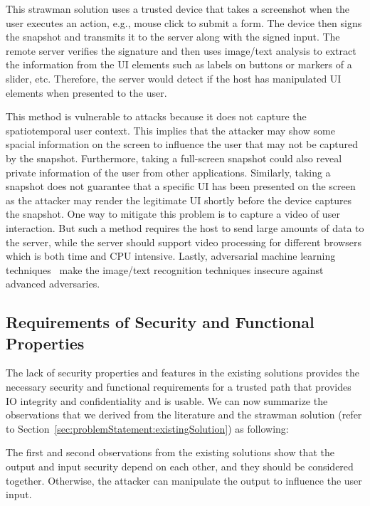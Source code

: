  This strawman solution uses a trusted device that takes a screenshot when the user executes an action, e.g., mouse click to submit a form. The device then signs the snapshot and transmits it to the server along with the signed input. The remote server verifies the signature and then uses image/text analysis to extract the information from the UI elements such as labels on buttons or markers of a slider, etc. Therefore, the server would detect if the host has manipulated UI elements when presented to the user.

This method is vulnerable to attacks because it does not capture the spatiotemporal user context. This implies that the attacker may show some spacial information on the screen to influence the user that may not be captured by the snapshot. Furthermore, taking a full-screen snapshot could also reveal private information of the user from other applications. Similarly, taking a snapshot does not guarantee that a specific UI has been presented on the screen as the attacker may render the legitimate UI shortly before the device captures the snapshot.
One way to mitigate this problem is to capture a video of user interaction. But such a method requires the host to send large amounts of data to the server, while the server should support video processing for different browsers which is both time and CPU intensive. Lastly, adversarial machine learning techniques~\cite{eykholt2017robust,sitawarin2018rogue} make the image/text recognition techniques insecure against advanced adversaries.


\subsection{Requirements of Security and Functional Properties}
\label{sec:problemStatement:goals}

The lack of security properties and features in the existing solutions provides the necessary security and functional requirements for a trusted path that provides IO integrity and confidentiality and is usable. We can now summarize the observations that we derived from the literature and the strawman solution (refer to Section~\ref{sec:problemStatement:existingSolution}) as following:

The first and second observations from the existing solutions show that the output and input security depend on each other, and they should be considered together. Otherwise, the attacker can manipulate the output to influence the user input.

